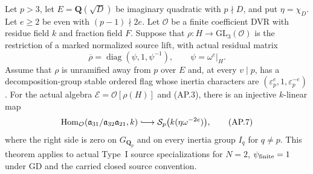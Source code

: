 \begin{theorem}
Let $p>3$, let $E=\mathbf Q(\sqrt D)$ be imaginary quadratic
with $p\nmid D$, and put $\eta=\chi_D$.
Let $e\ge2$ be even with $(p-1)\nmid2e$.
Let $\mathcal O$ be a finite coefficient DVR with residue
field $k$ and fraction field $F$.  Suppose that
$\rho:H\to\mathrm{GL}_3(\mathcal O)$ is the restriction of
a marked normalized source lift, with actual residual matrix
\[
 \overline\rho=\operatorname{diag}(\psi,1,\psi^{-1}),
 \qquad\psi=\omega^e|_H.                                   \tag{AP.6}
\]
Assume that $\rho$ is unramified away from $p$ over $E$ and,
at every $v\mid p$, has a decomposition-group stable ordered
flag whose inertia characters are
$(\varepsilon_p^e,1,\varepsilon_p^{-e})$.
For the actual algebra
$\mathcal E=\mathcal O[\rho(H)]$ and (AP.3), there is an
injective $k$-linear map
\[
 \operatorname{Hom}_{\mathcal O}
   (\mathfrak a_{31}/\mathfrak a_{32}\mathfrak a_{21},k)
 \lhook\joinrel\longrightarrow
 \mathcal S_p\bigl(k(\eta\omega^{-2e})\bigr),               \tag{AP.7}
\]
where the right side is zero on $G_{\mathbf Q_p}$ and on
every inertia group $I_q$ for $q\ne p$.
This theorem applies to actual Type~I source specializations
for $N=2$, $\psi_{\rm finite}=1$ under GD and the carried
closed source convention.
\end{theorem}

